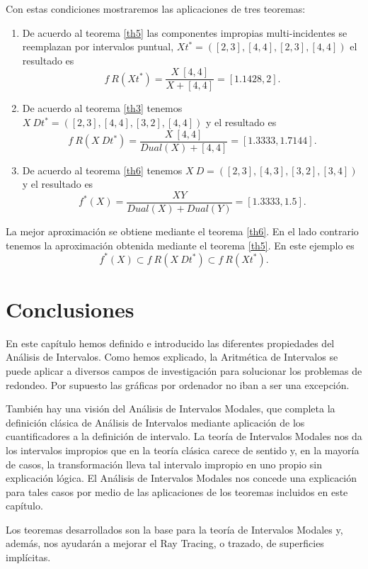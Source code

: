 Con estas condiciones mostraremos las aplicaciones de tres teoremas:
\begin{enumerate}
\item De acuerdo al teorema \ref{th5} las componentes impropias multi-incidentes se reemplazan por intervalos puntual, $Xt^* = ([2,3],[4,4],[2,3],[4,4])$ el resultado es
$$f \ R(Xt^*) = \frac{X \ [4,4]}{X + [4,4]} = [1.1428,2].$$
\item De acuerdo al teorema \ref{th3} tenemos $X \ Dt^* = ([2,3],[4,4],[3,2],[4,4])$ y el resultado es
$$f \ R(X \ Dt^*) = \frac{X \ [4,4]}{Dual(X) + [4,4]} = [1.3333,1.7144].$$
\item De acuerdo al teorema \ref{th6} tenemos $X \ D = ([2,3],[4,3],[3,2],[3,4])$ y el resultado es
$$f^*(X) = \frac{X Y}{Dual(X) + Dual(Y)} = [1.3333,1.5].$$
\end{enumerate}

La mejor aproximación se obtiene mediante el teorema \ref{th6}. En el lado contrario tenemos la aproximación obtenida mediante el teorema \ref{th5}. En este ejemplo es
$$f^*(X) \subset f \ R(X \ Dt^*) \subset f \ R(Xt^*).$$

\section{Conclusiones}

En este capítulo hemos definido e introducido las diferentes propiedades del Análisis de Intervalos. Como hemos explicado, la Aritmética de Intervalos se puede aplicar a diversos campos de investigación para solucionar los problemas de redondeo. Por supuesto las gráficas por ordenador no iban a ser una excepción.

También hay una visión del Análisis de Intervalos Modales, que completa la definición clásica de Análisis de Intervalos mediante aplicación de los cuantificadores a la definición de intervalo. La teoría de Intervalos Modales nos da los intervalos impropios que en la teoría clásica carece de sentido y, en la mayoría de casos, la transformación lleva tal intervalo impropio en uno propio sin explicación lógica. El Análisis de Intervalos Modales nos concede una explicación para tales casos por medio de las aplicaciones de los teoremas incluidos en este capítulo.

Los teoremas desarrollados son la base para la teoría de Intervalos Modales y, además, nos ayudarán a mejorar el Ray Tracing, o trazado, de superficies implícitas.
